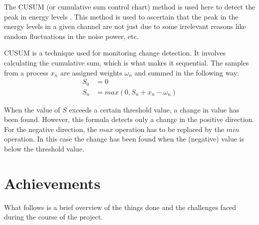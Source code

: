 The CUSUM (or cumulative sum control chart) method is used here to detect 
the peak in energy levels \cite{wikiCUSUM}. This method is used to ascertain 
that the peak in the energy levels in a given channel are not just due to some
irrelevant reasons like random fluctuations in the noise power, etc.
 
CUSUM is a technique used for monitoring change detection. It involves 
calculating the cumulative sum, which is what makes it sequential. The samples
from a process $x_n$ are assigned weights $\omega_n$ and summed in the 
following way:
\begin{align}
    S_0 &= 0 \nonumber \\
    S_n &= max(0, S_n + x_n - \omega_n) \nonumber
\end{align}

When the value of $S$ exceeds a certain threshold value, a change in value has 
been found. However, this formula detects only a change in the positive 
direction. For the negative direction, the $max$ operation has to be replaced 
by the $min$ operation. In this case the change has been found when the 
(negative) value is below the threshold value.


\section{Achievements}

What follows is a brief overview of the things done and the challenges faced 
during the course of the project.


